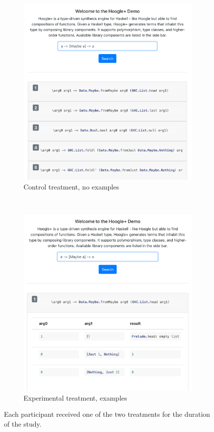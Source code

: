 \begin{figure}[t!]
    \centering
    \begin{subfigure}[t]{0.5\textwidth}
        \centering
        \includegraphics[width=\textwidth]{method/control-ui.png}
        \caption{Control treatment, no examples}
    \end{subfigure}%
    ~
    \begin{subfigure}[t]{0.5\textwidth}
        \centering
        \includegraphics[width=\textwidth]{method/treatment-ui.png}
        \caption{Experimental treatment, examples}
    \end{subfigure}
    \caption{Each participant received one of the two treatments for the duration of the study.}
\end{figure}